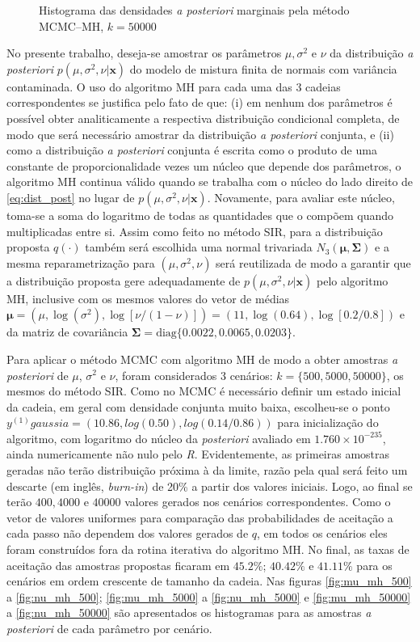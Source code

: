 \begin{figure}[t]
	\caption{Histograma das densidades \textit{a posteriori} marginais pela método MCMC--MH, $k = 50000$}%
\end{figure}

No presente trabalho, deseja-se amostrar os parâmetros $\mu, \sigma^2$ e $\nu$ da distribuição \textit{a posteriori} $p(\mu, \sigma^2, \nu | \bm{x})$ do modelo de mistura finita de normais com variância contaminada. O uso do algoritmo MH para cada uma das 3 cadeias correspondentes se justifica pelo fato de que: (i) em nenhum dos parâmetros é possível obter analiticamente a respectiva distribuição condicional completa, de modo que será necessário amostrar da distribuição \textit{a posteriori} conjunta, e (ii) como a distribuição \textit{a posteriori} conjunta é escrita como o produto de uma constante de proporcionalidade vezes um núcleo que depende dos parâmetros, o algoritmo MH continua válido quando se trabalha com o núcleo do lado direito de \eqref{eq:dist_post} no lugar de $p(\mu, \sigma^2, \nu | \bm{x})$. Novamente, para avaliar este núcleo, toma-se a soma do logaritmo de todas as quantidades que o compõem quando multiplicadas entre si. Assim como feito no método SIR, para a distribuição proposta $q(\cdot)$ também será escolhida uma normal trivariada $N_3(\bm{\mu}, \bm{\Sigma})$ e a mesma reparametrização para $(\mu, \sigma^2, \nu)$ será reutilizada de modo a garantir que a distribuição proposta gere adequadamente de $p(\mu, \sigma^2, \nu | \bm{x})$ pelo algoritmo MH, inclusive com os mesmos valores do vetor de médias $\bm{\mu} = (\mu, \log(\sigma^2), \log[\nu/(1-\nu)]) = (11, \log(0.64), \log[0.2/0.8])$ e da matriz de covariância $\bm{\Sigma} = \textrm{diag}\{0.0022, 0.0065, 0.0203\}$.

Para aplicar o método MCMC com algoritmo MH de modo a obter amostras \textit{a posteriori} de $\mu$, $\sigma^2$ e $\nu$, foram considerados 3 cenários: $k = \{500, 5000, 50000\}$, os mesmos do método SIR. Como no MCMC é necessário definir um estado inicial da cadeia, em geral com densidade conjunta muito baixa, escolheu-se o ponto $y^{(1)}gaussia = (10.86, log(0.50), log(0.14/0.86))$ para inicialização do algoritmo, com logaritmo do núcleo da \textit{posteriori} avaliado em $1.760 \times 10^{-235}$, ainda numericamente não nulo pelo \textit{R}. Evidentemente, as primeiras amostras geradas não terão distribuição próxima à da limite, razão pela qual será feito um descarte (em inglês, \textit{burn-in}) de 20\% a partir dos valores iniciais. Logo, ao final se terão $400, 4000$ e $40000$ valores gerados nos cenários correspondentes. Como o vetor de valores uniformes para comparação das probabilidades de aceitação a cada passo não dependem dos valores gerados de $q$, em todos os cenários eles foram construídos fora da rotina iterativa do algoritmo MH. No final, as taxas de aceitação das amostras propostas ficaram em $45.2\%$; $40.42\%$ e $41.11\%$ para os cenários em ordem crescente de tamanho da cadeia. Nas figuras \ref{fig:mu_mh_500} a \ref{fig:nu_mh_500}; \ref{fig:mu_mh_5000} a \ref{fig:nu_mh_5000} e \ref{fig:mu_mh_50000} a \ref{fig:nu_mh_50000} são apresentados os histogramas para as amostras \textit{a posteriori} de cada parâmetro por cenário.


